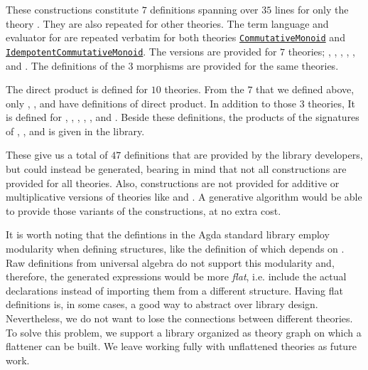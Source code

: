 These constructions constitute $7$ definitions spanning over $35$ lines for only the theory . They are also repeated for other theories. The term language and evaluator for  are repeated verbatim for both theories 
\href{https://github.com/agda/agda-stdlib/blob/c61b159363ce2390049ce8e1e5422f61f17ec3b7/src/Algebra/Solver/CommutativeMonoid.agda}
{\lstinline|CommutativeMonoid|}
and 
\href{https://github.com/agda/agda-stdlib/blob/c61b159363ce2390049ce8e1e5422f61f17ec3b7/src/Algebra/Solver/IdempotentCommutativeMonoid.agda}
{\lstinline|IdempotentCommutativeMonoid|}. The  versions are provided for $7$ theories; , , , , , and . The definitions of the $3$ morphisms are provided for the same theories. 

The direct product is defined for $10$ theories. From the $7$ that we defined above, only , , and  have definitions of direct product. In addition to those $3$ theories, It is defined for , , , , , and . Beside these definitions, the products of the signatures of , , and  is given in the library.  

These give us a total of $47$ definitions that are provided by the library developers, but could instead be generated, bearing in mind that not all constructions are provided for all theories. Also, constructions are not provided for additive or multiplicative versions of theories like  and . A generative algorithm would be able to provide those variants of the constructions, at no extra cost. 

It is worth noting that the defintions in the Agda standard library employ modularity when defining structures, like the definition of  which depends on . Raw definitions from universal algebra do not support this modularity and, therefore, the generated expressions would be more \emph{flat}, i.e. include the actual declarations instead of importing them from a different structure. Having flat definitions is, in some cases, a good way to abstract over library design. Nevertheless, we do not want to lose the connections between different theories. To solve this problem, we support a library organized as theory graph on which a flattener can be built. We leave working fully with unflattened theories as future work.  

